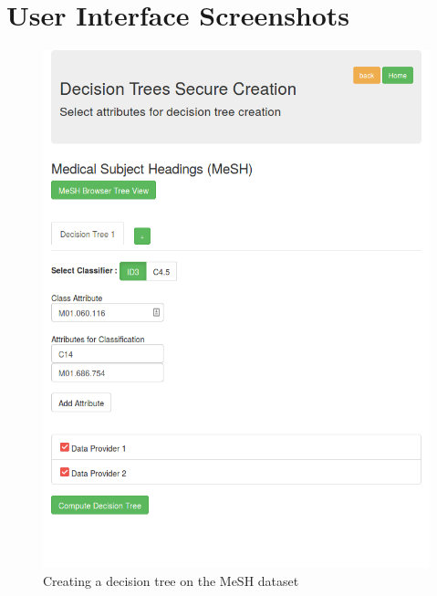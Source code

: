 \chapter{User Interface Screenshots}\label{c:ui}


\begin{minipage}{0.47\textwidth}
  \begin{figure}[H]
  \includegraphics[width=\columnwidth]{figures/mesh_id3_1.png}
  \caption{Creating a decision tree on the MeSH dataset}
  \label{f:mesh-id3-1}
\end{figure}
\end{minipage}
